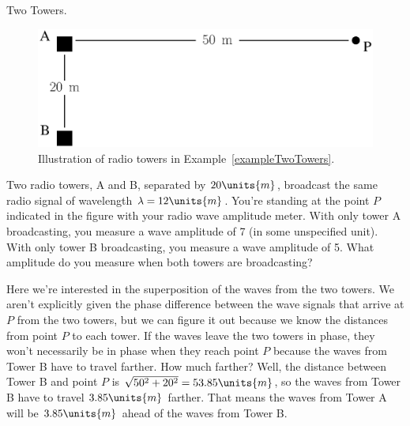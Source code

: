 \begin{exampleb}{Two Towers.} 
\label{exampleTwoTowers}
\begin{figure}\begin{center}
 \includegraphics[width=3.0truein]{phasors/phasor12} 
\caption{\label{fig:phasor12}Illustration of radio towers in 
Example~\ref{exampleTwoTowers}.}
\end{center}
\end{figure}
Two radio towers, A and B, separated by $20\units{m}$,
broadcast the same radio signal of wavelength $\lambda =
12\units{m}$. You're standing at the point $P$ indicated in the
figure with your radio wave amplitude meter.
With only tower A broadcasting, you measure a wave amplitude
of 7 (in some unspecified unit).  With only tower B broadcasting, you
measure a wave amplitude of 5. What amplitude do you measure when both
towers are broadcasting?
\begin{solution}
Here we're interested in the superposition of the waves from the two
towers. We aren't explicitly given the phase difference between the
wave signals that arrive at $P$ from the two towers, but we can figure
it out because we know the distances from point $P$ to each tower. If
the waves leave the two towers in phase, they won't necessarily be in
phase when they reach point $P$ because the waves from Tower B have to
travel farther. How much farther? Well, the distance between Tower B
and point $P$ is $\sqrt{50^2 + 20^2} = 53.85\units{m}$, so the waves
from Tower B have to travel $3.85\units{m}$ farther. That means the
waves from Tower A will be $3.85\units{m}$ ahead of the waves from
Tower B.


\end{solution}
\end{exampleb}
